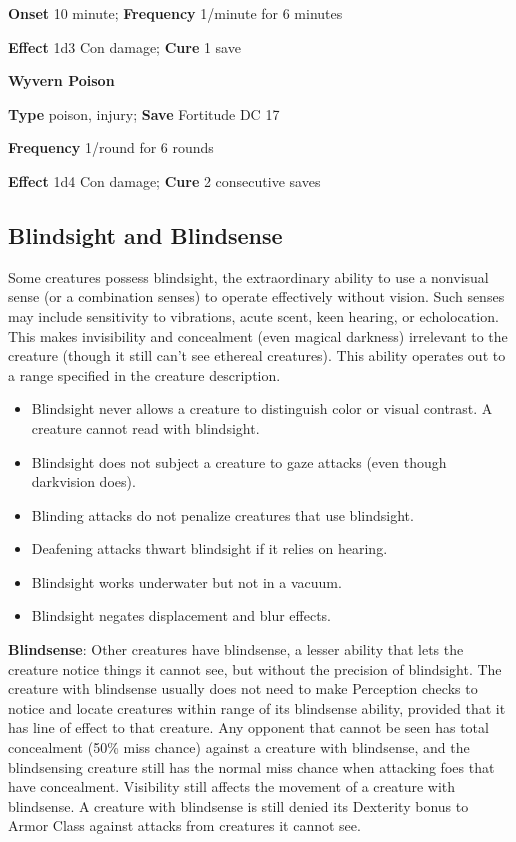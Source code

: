 \textbf{Onset }10 minute; \textbf{Frequency} 1/minute for 6 minutes
				
\textbf{Effect }1d3 Con damage;\textbf{ Cure} 1 save
				
\textbf{Wyvern Poison }
				
\textbf{Type} poison, injury; \textbf{Save} Fortitude DC 17 
				
\textbf{Frequency} 1/round for 6 rounds
				
\textbf{Effect }1d4 Con damage;\textbf{ Cure} 2 consecutive saves
				
\subsection{Blindsight and Blindsense}

				
Some creatures possess blindsight, the extraordinary ability to use a nonvisual sense (or a combination senses) to operate effectively without vision. Such senses may include sensitivity to vibrations, acute scent, keen hearing, or echolocation. This makes invisibility and concealment (even magical darkness) irrelevant to the creature (though it still can't see ethereal creatures). This ability operates out to a range specified in the creature description.
				\begin{itemize}\item  Blindsight never allows a creature to distinguish color or visual contrast. A creature cannot read with blindsight.
				\item  Blindsight does not subject a creature to gaze attacks (even though darkvision does).
				\item  Blinding attacks do not penalize creatures that use blindsight.
				\item  Deafening attacks thwart blindsight if it relies on hearing.
				\item  Blindsight works underwater but not in a vacuum.
				\item  Blindsight negates displacement and blur effects.
\end{itemize}
				
\textbf{Blindsense}: Other creatures have blindsense, a lesser ability that lets the creature notice things it cannot see, but without the precision of blindsight. The creature with blindsense usually does not need to make Perception checks to notice and locate creatures within range of its blindsense ability, provided that it has line of effect to that creature. Any opponent that cannot be seen has total concealment (50\% miss chance) against a creature with blindsense, and the blindsensing creature still has the normal miss chance when attacking foes that have concealment. Visibility still affects the movement of a creature with blindsense. A creature with blindsense is still denied its Dexterity bonus to Armor Class against attacks from creatures it cannot see.
				
